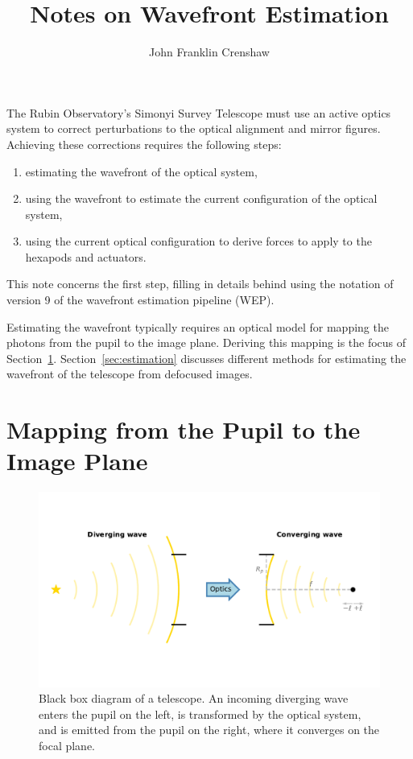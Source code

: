 \documentclass[TS,authoryear,toc]{lsstdoc}
\title{Notes on Wavefront Estimation}
\author{John Franklin Crenshaw}
\date{\vcsDate}
\begin{document}
\mkshorttitle


\label{start}

The Rubin Observatory's Simonyi Survey Telescope must use an active optics system to correct perturbations to the optical alignment and mirror figures.
Achieving these corrections requires the following steps:
\begin{enumerate}
  \item estimating the wavefront of the optical system,
  \item using the wavefront to estimate the current configuration of the optical system,
  \item using the current optical configuration to derive forces to apply to the hexapods and actuators.
\end{enumerate}
This note concerns the first step, filling in details behind \citet{2015ApOpt..54.9045X} using the notation of version 9 of the wavefront estimation pipeline (WEP).

Estimating the wavefront typically requires an optical model for mapping the photons from the pupil to the image plane.
Deriving this mapping is the focus of Section~\ref{sec:mapping}.
Section~\ref{sec:estimation} discusses different methods for estimating the wavefront of the telescope from defocused images.


\section{Mapping from the Pupil to the Image Plane}
\label{sec:mapping}

\begin{figure}[t]
  \centering
  \includegraphics[width=0.9\linewidth]{figures/telescope_blackbox.pdf}
  \caption{
      Black box diagram of a telescope.
      An incoming diverging wave enters the pupil on the left, is transformed by the optical system, and is emitted from the pupil on the right, where it converges on the focal plane.
  }
  \label{fig:telescope}
\end{figure}
\end{document}
